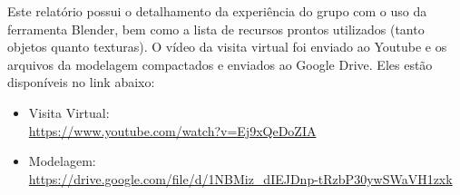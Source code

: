 Este relatório possui o detalhamento da experiência do grupo com o uso da ferramenta Blender, bem como a lista de recursos prontos utilizados (tanto objetos quanto texturas). O vídeo da visita virtual foi enviado ao Youtube e os arquivos da modelagem compactados e enviados ao Google Drive. Eles estão disponíveis no link abaixo:

\begin{itemize}
    \item Visita Virtual: \\
    \url{https://www.youtube.com/watch?v=Ej9xQeDoZIA}
    \item Modelagem: \\
    \url{https://drive.google.com/file/d/1NBMiz\_dIEJDnp-tRzbP30ywSWaVH1zxk}
\end{itemize}
